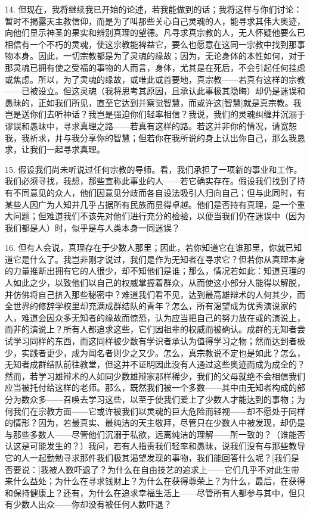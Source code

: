 14. 但现在，我将继续我已开始的论述，若我能做到的话；我将这样与你们讨论：暂时不揭露天主教信仰，而是为了叫那些关心自己灵魂的人，能寻求其伟大奥迹，向他们显示神圣的果实和辨别真理的望德。凡寻求真宗教的人，无人怀疑他要么已相信有一个不朽的灵魂，使这宗教能裨益它，要么也愿意在这同一宗教中找到那事物本身。因此，一切宗教都是为了灵魂的缘故；因为，无论身体的本性如何，对于那灵魂已拥有使之受福的事物的人而言，身体，尤其是在死后，不会引起任何挂虑或焦虑。所以，为了灵魂的缘故，或唯此或首要地，真宗教——若真有这样的宗教——已被设立。但这灵魂（我将思考其原因，且承认此事极其隐晦）却仍是迷误和愚昧的，正如我们所见，直至它达到并察觉智慧，而或许这[智慧]就是真宗教。我岂是送你们去听神话？我岂是强迫你们轻率相信？我说，我们的灵魂纠缠并沉溺于谬误和愚昧中，寻求真理之路——若真有这样的路。若这并非你的情况，请宽恕我，我祈求，并与我分享你的智慧；但若你在我所说的身上认出你自己，那么我恳求，让我们一起寻求真理。\par

15. 假设我们尚未听说过任何宗教的导师。看，我们承担了一项新的事业和工作。我们必须寻找，我想，那些宣称此事业的人——若它确实存在。假设我们找到了持有不同意见的众人，他们因意见分歧而各自设法吸引人归向自己；但与此同时，有某些人因广为人知并几乎占据所有民族而显得卓越。他们是否持有真理，是一个重大问题；但难道我们不该先对他们进行充分的检验，以便当我们仍在迷误中（因为我们都是人）时，似乎是与人类本身一同迷误？\par

16. 但有人会说，真理存在于少数人那里；因此，若你知道它在谁那里，你就已知道它是什么了。我岂非刚才说过，我们是作为无知者在寻求它？但若你从真理本身的力量推断出拥有它的人很少，却不知他们是谁；那么，情况若如此：知道真理的人如此之少，以致他们以自己的权威掌握着群众，从而使这小部分人能得以解脱，并仿佛将自己挤入那些秘密中？难道我们看不见，达到最高雄辩术的人何其少，而全世界的修辞学校里却充满成群结队的青年？怎么，所有渴望成为优秀演说家的人，难道会因众多无知者的缘故而惊恐，认为应当把自己的努力放在或的演说上，而非的演说上？所有人都追求这些，它们因祖辈的权威而被确认。成群的无知者尝试学习同样的东西，而这同样被少数有学识者承认为值得学习之物；然而达到者极少，实践者更少，成为闻名者则少之又少。怎么，真宗教说不定也是如此？怎么，无知者成群结队前往教堂，但这并不证明因此没有人通过这些奥迹而成为成全的？然而，若学习雄辩术的人如同少数雄辩家那样稀少，我们的父母就绝不会相信我们应当被托付给这样的老师。那么，既然我们被一个多数——其中由无知者构成的部分为数众多——召唤去学习这些，以至于使我们爱上了少数人才能达到的事物；为何我们在宗教方面——它或许被我们以灵魂的巨大危险而轻视——却不愿处于同样的情形？因为，若最真实、最纯洁的天主敬拜，尽管只在少数人中被发现，却仍是与那些多数人——尽管他们沉溺于私欲，远离纯洁的理解——所一致的？（谁能否认这是可能发生的？）我问，若有人指责我们轻率和愚昧，说我们没有与那些教导它的人一起勤勉寻求那件我们极其渴望发现的事物，我们能回答什么呢？[我们是否要说：]我被人数吓退了？为什么在自由技艺的追求上——它们几乎不对此生带来什么益处；为什么在寻求钱财上？为什么在获得尊荣上？为什么，最后，在获得和保持健康上？还有，为什么在追求幸福生活上——尽管所有人都参与其中，但只有少数人出众——你却没有被任何人数吓退？\par

